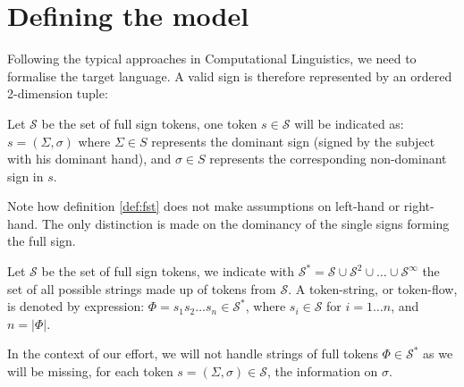 
\section{Defining the model}
\label{sec:model}

Following the typical approaches in Computational Linguistics, we need to formalise the target language.
A valid sign is therefore represented by an ordered 2-dimension tuple:

\begin{definition} \label{def:fst}
Let $\mathcal{S}$ be the set of full sign tokens, one token $s \in \mathcal{S}$ will be indicated as:
$s = (\Sigma, \sigma)$ where $\Sigma \in S$ represents the dominant sign (signed by the subject with his
dominant hand), and $\sigma \in S$ represents the corresponding non-dominant sign in $s$.
\end{definition}

Note how definition \ref{def:fst} does not make assumptions on left-hand or right-hand. The only distinction
is made on the dominancy of the single signs forming the full sign.

\begin{definition}
Let $\mathcal{S}$ be the set of full sign tokens, we indicate with 
$\mathcal{S}^\ast = \mathcal{S} \cup \mathcal{S}^2 \cup \dots \cup \mathcal{S}^\infty$ the set of all possible
strings made up of tokens from $\mathcal{S}$. A token-string, or token-flow, is denoted by expression:
$\Phi = s_1 s_2 \dots s_n \in \mathcal{S}^\ast$, where $s_i \in \mathcal{S}$ for $i = 1 \dots n$, and 
$n = |\Phi|$.
\end{definition}

In the context of our effort, we will not handle strings of full tokens $\Phi \in \mathcal{S}^\ast$ as we will
be missing, for each token $s = (\Sigma, \sigma) \in \mathcal{S}$, the information on $\sigma$.
